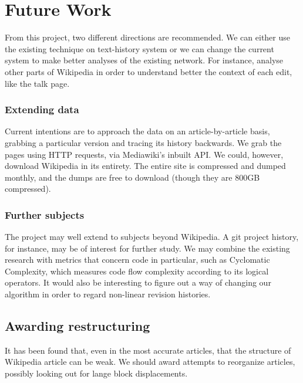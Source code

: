 \section{Future Work}

From this project, two different directions are recommended. We can
either use the existing technique on text-history system or we can
change the current system to make better analyses of the existing
network. For instance, analyse other parts of Wikipedia in order to
understand better the context of each edit, like the talk page. 

\subsubsection*{Extending data}
Current intentions are to approach the data on an article-by-article
basis, grabbing a particular version and tracing its history
backwards. We grab the pages using HTTP requests, via Mediawiki's
inbuilt API. We could, however, download Wikipedia in its
entirety. The entire site is compressed and dumped monthly, and the
dumps are free to download (though they are 800GB
compressed).\cite{wiki-dump}


\subsubsection*{Further subjects}
The project may well extend to subjects beyond Wikipedia. A git
project history, for instance, may be of interest for further
study. We may combine the existing research with metrics that concern
code in particular, such as Cyclomatic Complexity, which measures code
flow complexity according to its logical operators.\cite{McCabe1976}
It would also be interesting to figure out a way of changing our
algorithm in order to regard non-linear revision histories.

\subsection*{Awarding restructuring}
\label{restructuring}
It has been found that, even in the most accurate articles, that the
structure of Wikipedia article can be weak.\cite{Giles2005} We should
award attempts to reorganize articles, possibly looking out for lange
block displacements. 

